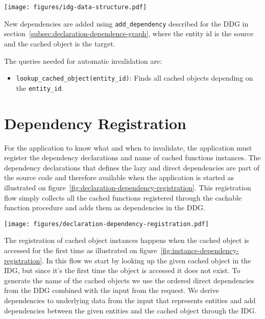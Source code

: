 \begin{figure*}[ht!]
  \centering
  \texttt{[image: figures/idg-data-structure.pdf]}
  \caption{An illustration of the data structure representing the IDG on figure~\ref{fig:instance-dependence-graph}}
  \label{fig:idg-data-structure}
\end{figure*}

New dependencies are added using \verb$add_dependency$ described for the DDG in section~\ref{subsec:declaration-dependence-graph}, where the entity id is the source and the cached object is the target.

The queries needed for automatic invalidation are:

\begin{itemize}
  \item \verb$lookup_cached_object(entity_id)$: Finds all cached objects depending on the \verb$entity_id$.
\end{itemize}




\section{Dependency Registration}
\label{sec:dependency-registration}

For the application to know what and when to invalidate, the application must register the dependency declarations and name of cached functions instances. The dependency declarations that defines the lazy and direct dependencies are part of the source code and therefore available when the application is started as illustrated on figure~\ref{fig:declaration-dependency-registration}. This registration flow simply collects all the cached functions registered through the cachable function procedure and adds them as dependencies in the DDG.

\begin{figure*}[ht!]
  \centering
  \texttt{[image: figures/declaration-dependency-registration.pdf]}
  \caption{The flow in which lazy and direct dependencies are registered from the declarations}
  \label{fig:declaration-dependency-registration}
\end{figure*}

The registration of cached object instances happens when the cached object is accessed for the first time as illustrated on figure~\ref{fig:instance-dependency-registration}. In this flow we start by looking up the given cached object in the IDG, but since it's the first time the object is accessed it does not exist. To generate the name of the cached objects we use the ordered direct dependencies from the DDG combined with the input from the request. We derive dependencies to underlying data from the input that represents entities and add dependencies between the given entities and the cached object through the IDG.

